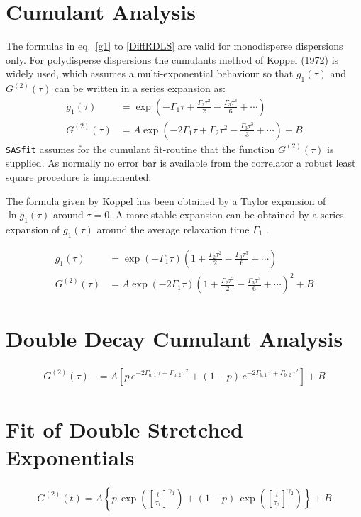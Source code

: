 \section{Cumulant Analysis}
The formulas in eq.\ \ref{g1} to \ref{DiffRDLS} are valid for monodisperse
dispersions only. For polydisperse dispersions the cumulants method of Koppel (1972) \cite{Koppel1972} is widely used,
which assumes a multi-exponential behaviour so that $g_1(\tau)$ and $G^{(2)}(\tau)$
can be written in a series expansion as:
\begin{align}
 g_1(\tau)  &= \exp\left(-\Gamma_1 \tau + \frac{\Gamma_2 \tau^2}{2} - \frac{\Gamma_3 \tau^3}{6} + \cdots \right)\\
 G^{(2)}(\tau) &=  A \exp\left(- 2\Gamma_1 \tau + \Gamma_2 \tau^2 - \frac{\Gamma_3 \tau^3}{3} + \cdots \right) + B
\label{G2Cumulant}
\end{align}
\texttt{SASfit} assumes for the cumulant fit-routine that the function $G^{(2)}(\tau)$ is supplied. As normally no error bar is available from the correlator a robust least square procedure is implemented.

The formula given by Koppel has been obtained by a Taylor expansion of $\ln g_1(\tau)$ around $\tau=0$. A more stable expansion can be obtained by a series expansion of $g_1(\tau)$ around the average relaxation time $\Gamma_1$ \cite{Pusey1974,Dhont1996, Frisken2001,Mailer2015}.

\begin{align}
 g_1(\tau)  &= \exp\left(-\Gamma_1 \tau\right) \left(1 +  \frac{\Gamma_2 \tau^2}{2} - \frac{\Gamma_3 \tau^3}{6} + \cdots \right) \\
G^{(2)}(\tau) &= A \exp\left(- 2\Gamma_1 \tau\right) \left(1 +  \frac{\Gamma_2 \tau^2}{2} - \frac{\Gamma_3 \tau^3}{6} + \cdots \right)^2 + B
\end{align}

\newpage
\section{Double Decay Cumulant Analysis}
\begin{align}
G^{(2)}(\tau) &=  A \left[p \, e^{- 2\Gamma_{a,1}\, \tau + \Gamma_{a,2}\, \tau^2}
                     +(1-p) \, e^{- 2\Gamma_{b,1}\, \tau + \Gamma_{b,2}\, \tau^2}\right] + B
\label{G2DoubleCumulantDecay}
\end{align}

\newpage
\section{Fit of Double Stretched Exponentials}
\begin{align}
G^{(2)}(t) = A \left\{p \, \exp\left(\left[\frac{t}{\tau_1}\right]^{\gamma_1}\right)
+ (1-p) \, \exp\left(\left[\frac{t}{\tau_2}\right]^{\gamma_2}\right)
\right\} + B \label{G2DoubleExpDecay}
\end{align}



